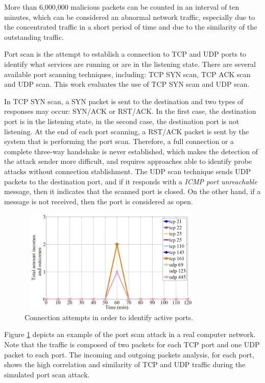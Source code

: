 \documentclass[review]{elsarticle}
\begin{document}
More than 6,000,000 malicious packets can be counted in an interval of ten minutes, which can be considered an abnormal network traffic, especially due to the concentrated traffic in a short period of time and due to the similarity of the outstanding traffic.

Port scan is the attempt to establish a connection to TCP and UDP ports to identify what services are running or are in the listening state. There are several available port scanning techniques, including: TCP SYN scan, TCP ACK scan and UDP scan. This work evaluates the use of TCP SYN scan and UDP scan. 

In TCP SYN scan, a SYN packet is sent to the destination and two types of responses may occur: SYN/ACK or RST/ACK. In the first case, the destination port is in the listening state, in the second case, the destination port is not listening. At the end of each port scanning, a RST/ACK packet is sent by the system that is performing the port scan. Therefore, a full connection or a complete three-way handshake is never established, which makes the detection of the attack sender more difficult, and requires approaches able to identify probe attacks without connection stablishment. The UDP scan technique sends UDP packets to the destination port, and if it responds with a \emph{ICMP port unreachable} message, then it indicates that the scanned port is closed. On the other hand, if a message is not received, then the port is considered as open.

\begin{figure}[h!]
     \centering 
     \includegraphics[height=5cm, width=9cm]{results/figures/fig07.png}
     \caption{Connection attempts in order to identify active ports.}
     \label{fig:fig7}
\end{figure}

Figure \ref{fig:fig7} depicts an example of the port scan attack in a real computer network. Note that the traffic is composed of two packets for each TCP port and one UDP packet to each port. The incoming and outgoing packets analysis, for each port, shows the high correlation and similarity of TCP and UDP traffic during the simulated port scan attack.
\end{document}
